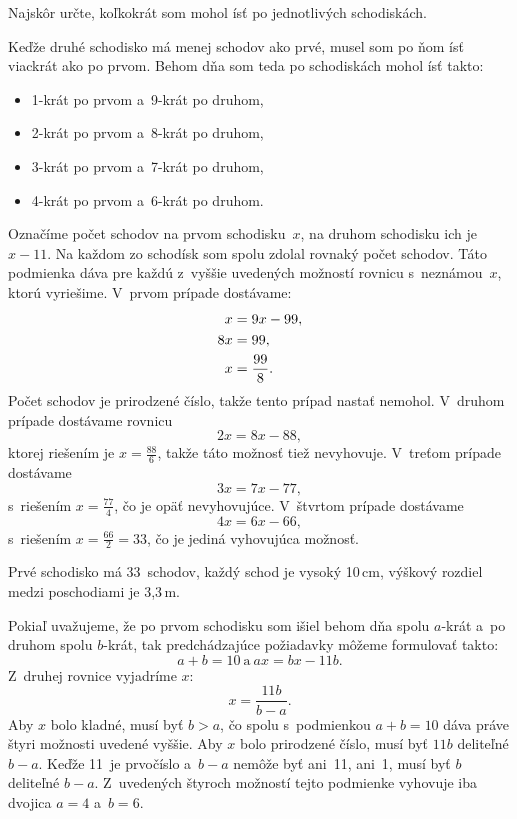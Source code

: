{%
\napad
Najskôr určte, koľkokrát som mohol ísť po jednotlivých schodiskách.

\riesenie
Keďže druhé schodisko má menej schodov ako prvé, musel som po ňom ísť
viackrát ako po prvom.
Behom dňa som teda po schodiskách mohol ísť takto:
\begin{itemize}
\item 1-krát po prvom a~9-krát po druhom,
\item 2-krát po prvom a~8-krát po druhom,
\item 3-krát po prvom a~7-krát po druhom,
\item 4-krát po prvom a~6-krát po druhom.
\end{itemize}
Označíme počet schodov na prvom schodisku~$x$, na druhom schodisku
ich je $x-11$. Na každom zo schodísk som spolu zdolal rovnaký počet
schodov. Táto podmienka dáva pre každú z~vyššie uvedených možností
rovnicu s~neznámou~$x$, ktorú vyriešime. V~prvom prípade dostávame:
$$\aligned
x&=9x-99,\\
8x&=99,\\
x&=\frac{99}8.
\endaligned
$$
Počet schodov je prirodzené číslo, takže tento prípad nastať nemohol.
V~druhom prípade dostávame rovnicu
$$
2x=8x-88,
$$
ktorej riešením je $x=\frac{88}6$, takže táto možnosť tiež nevyhovuje.
V~treťom prípade dostávame
$$
3x=7x-77,
$$
s~riešením $x=\frac{77}4$, čo je opäť nevyhovujúce.
V~štvrtom prípade dostávame
$$
4x=6x-66,
$$
s~riešením $x=\frac{66}2=33$, čo je jediná vyhovujúca možnosť.

Prvé schodisko má 33~schodov, každý schod je vysoký 10\,cm,
výškový rozdiel medzi poschodiami je 3,3\,m.

\poznamka
Pokiaľ uvažujeme, že po prvom schodisku som išiel behom dňa spolu
$a$-krát a~po druhom spolu $b$-krát, tak predchádzajúce požiadavky môžeme
formulovať takto:
$$
a+b=10\ \text{a}\ ax=bx-11b.
$$
Z~druhej rovnice vyjadríme $x$:
$$
x=\frac{11b}{b-a}.
$$
Aby $x$ bolo kladné, musí byť $b>a$, čo spolu s~podmienkou $a+b=10$ dáva
práve štyri možnosti uvedené vyššie.
Aby $x$ bolo prirodzené číslo, musí byť $11b$ deliteľné $b-a$. Keďže
11~je prvočíslo a~$b-a$ nemôže byť ani~11, ani~1, musí byť $b$
deliteľné $b-a$. Z~uvedených štyroch možností tejto podmienke vyhovuje
iba dvojica $a=4$ a~$b=6$.
}

